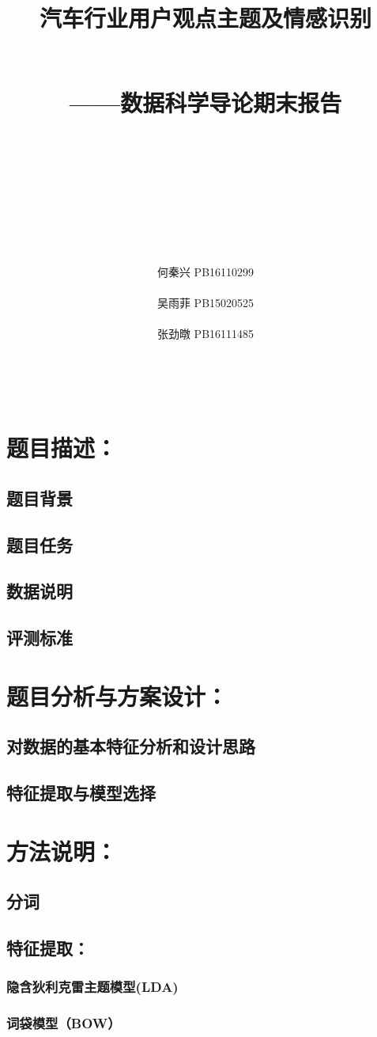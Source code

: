 \documentclass{article}
\author{
\\ \\ \\ \\ \\ \\ \\ \\
何秦兴 PB16110299 \\ \\ 
吴雨菲 PB15020525 \\ \\
张劲暾 PB16111485 \\ \\ \\ \\
}
\title{
	\begin{huge}
	\textbf{汽车行业用户观点主题及情感识别}\\[26pt]
\end{huge} 
	\\——数据科学导论期末报告\\[3pt]
}
\begin{document}
 
   \maketitle
   \newpage
   \tableofcontents
   \newpage
   \section{题目描述：} 
    \subsection{题目背景}
    \subsection{题目任务}
    \subsection{数据说明}
    \subsection{评测标准}
   \section{题目分析与方案设计：} 
  	\subsection{对数据的基本特征分析和设计思路}
    \subsection{特征提取与模型选择}
   \section{方法说明：}
   	\subsection{分词}
    \subsection{特征提取：}
     \subsubsection{隐含狄利克雷主题模型(LDA)}
     \subsubsection{词袋模型（BOW）}
\end{document}
